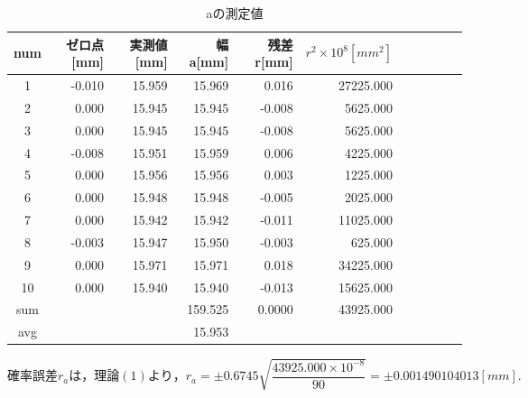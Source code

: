 \documentclass[a4paper,1pt]{jsarticle}
\begin{document}
\begin{table}[H]
  \caption{aの測定値}
  \label{table:SpeedOfLight}
  \centering
  \begin{tabular}{|c||r|r|r|r|r|r|r|r|r|r|}
    \hline
    num & ゼロ点[mm] & 実測値[mm] & 幅 a[mm] & 残差 r[mm] & $r^2\times10^8[mm^2]$  \\
    \hline\hline
    1 & -0.010 & 15.959 & 15.969 & 0.016 & 27225.000 \\
    2 & 0.000 & 15.945 & 15.945 & -0.008 & 5625.000 \\
    3 & 0.000 & 15.945 & 15.945 & -0.008 & 5625.000 \\
    4 & -0.008 & 15.951 & 15.959 & 0.006 & 4225.000 \\
    5 & 0.000 & 15.956 & 15.956 & 0.003 & 1225.000 \\
    6 & 0.000 & 15.948 & 15.948 & -0.005 & 2025.000 \\
    7 & 0.000 & 15.942 & 15.942 & -0.011 & 11025.000 \\
    8 & -0.003 & 15.947 & 15.950 & -0.003 & 625.000 \\
    9 & 0.000 & 15.971 & 15.971 & 0.018 & 34225.000 \\
    10 & 0.000 & 15.940 & 15.940 & -0.013 & 15625.000 \\
    \hline\hline
    sum &  &  & 159.525 & 0.0000 & 43925.000 \\
    \hline
    avg &  &  & 15.953 &  &  \\

    \hline
  \end{tabular}

\end{table}

$確率誤差r_aは，理論(1)より，r_a=\pm0.6745\sqrt{\dfrac{43925.000\times10^{-8}}{90}}=\pm0.001490104013[mm].$
\end{document}
